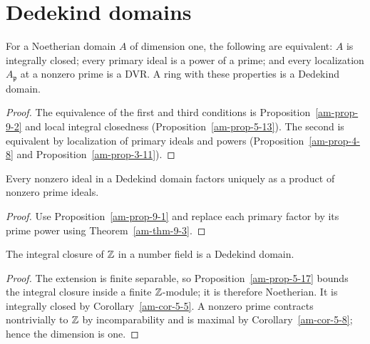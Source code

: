 \section{Dedekind domains}
\label{am-ch9-dedekind}
\begin{theorem}
\label{am-thm-9-3}
\uses{}
For a Noetherian domain $A$ of dimension one, the following are equivalent:
$A$ is integrally closed; every primary ideal is a power of a prime; and every
localization $A_\mathfrak{p}$ at a nonzero prime is a DVR.  A ring with these properties
is a Dedekind domain.
\end{theorem}
\begin{proof}
The equivalence of the first and third conditions is Proposition~\ref{am-prop-9-2}
and local integral closedness (Proposition~\ref{am-prop-5-13}).  The second is
equivalent by localization of primary ideals and powers (Proposition~\ref{am-prop-4-8}
and Proposition~\ref{am-prop-3-11}).
\end{proof}
\begin{corollary}
\label{am-cor-9-4}
\uses{}
Every nonzero ideal in a Dedekind domain factors uniquely as a product of
nonzero prime ideals.
\end{corollary}
\begin{proof}
Use Proposition~\ref{am-prop-9-1} and replace each primary factor by its prime
power using Theorem~\ref{am-thm-9-3}.
\end{proof}
\begin{theorem}
\label{am-thm-9-5}
\uses{}
The integral closure of $\mathbb Z$ in a number field is a Dedekind domain.
\end{theorem}
\begin{proof}
The extension is finite separable, so Proposition~\ref{am-prop-5-17} bounds
the integral closure inside a finite $\mathbb Z$-module; it is therefore Noetherian.
It is integrally closed by Corollary~\ref{am-cor-5-5}.  A nonzero prime
contracts nontrivially to $\mathbb Z$ by incomparability and is maximal by
Corollary~\ref{am-cor-5-8}; hence the dimension is one.
\end{proof}

